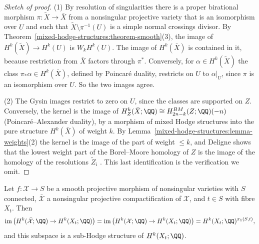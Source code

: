 \begin{proof}[Sketch of proof]
(1) By resolution of singularities there is a proper birational morphism $\pi \colon \tilde X \to \bar X$ from a nonsingular projective variety that is an isomorphism over $U$ and such that
$\tilde X \setminus \pi^{-1}(U)$ is a simple normal crossings divisor. By Theorem~\ref{mixed-hodge-structures:theorem-smooth}(3), the image of $H^k(\tilde X) \to H^k(U)$ is $W_kH^k(U)$. The image of
$H^k(\bar X)$ is contained in it, because restriction from $\bar X$ factors through $\pi^*$. Conversely, for $\alpha \in H^k(\tilde X)$ the class $\pi_*\alpha \in H^k(\bar X)$, defined by Poincar\'e duality,
restricts on $U$ to $\alpha|_U$, since $\pi$ is an isomorphism over $U$. So the two images agree.

(2) The Gysin images restrict to zero on $U$, since the classes are supported on $Z$. Conversely, the kernel is the image of $H^k_Z(\bar X; \QQ) \cong H^{BM}_{2n-k}(Z; \QQ)(-n)$ (Poincar\'e--Alexander
duality), by a morphism of mixed Hodge structures into the pure structure $H^k(\bar X)$ of weight $k$. By Lemma~\ref{mixed-hodge-structures:lemma-weights}(2) the kernel is the image of the part of weight
$\leq k$, and Deligne shows that the lowest weight part of the Borel--Moore homology of $Z$ is the image of the homology of the resolutions $\tilde Z_i$ \cite{deligne-hodge-3}. This last
identification is the verification we omit.
\end{proof}

\begin{theorem}\label{mixed-hodge-structures:theorem-global-invariant}
Let $f \colon \mathcal{X} \to S$ be a smooth projective morphism of nonsingular varieties with $S$ connected, $\bar{\mathcal{X}}$ a nonsingular projective compactification of $\mathcal{X}$, and $t \in S$ with
fibre $X_t$. Then
\[
\operatorname{im}\big(H^k(\bar{\mathcal{X}}; \QQ) \to H^k(X_t; \QQ)\big) = \operatorname{im}\big(H^k(\mathcal{X}; \QQ) \to H^k(X_t; \QQ)\big) = H^k(X_t; \QQ)^{\pi_1(S, t)},
\]
and this subspace is a sub-Hodge structure of $H^k(X_t; \QQ)$.
\end{theorem}

